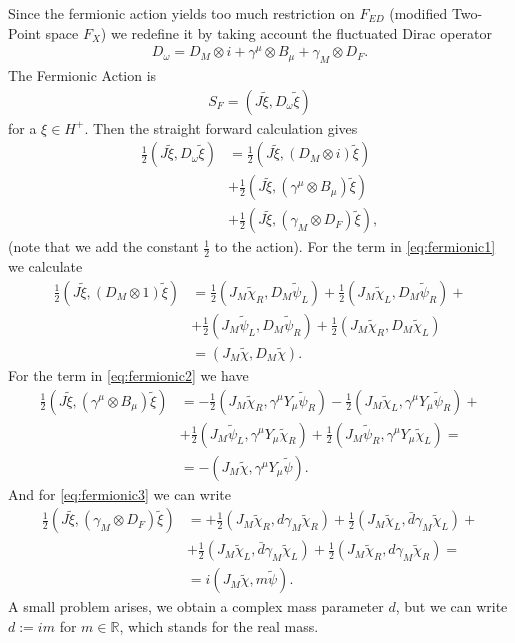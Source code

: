 Since the fermionic action yields too much restriction on $F_{ED}$ (modified
Two-Point space $F_X$) we redefine it by taking account the fluctuated Dirac
operator
\begin{align}
    D_\omega = D_M \otimes i + \gamma^\mu \otimes B_\mu + \gamma_M \otimes
    D_F.
\end{align}
The Fermionic Action is
\begin{align}
S_F = (J\tilde{\xi}, D_\omega\tilde{\xi})
\end{align}
for a $\xi \in H^+$. Then the straight forward calculation gives \begin{align}
    \frac{1}{2}(J\tilde{\xi}, D_\omega\tilde{\xi})
        &=\frac{1}{2}(J\tilde{\xi}, (D_M \otimes
        i)\tilde{\xi})\label{eq:fermionic1}\\
        &+\frac{1}{2}(J\tilde{\xi}, (\gamma^\mu \otimes B_\mu)
        \tilde{\xi})\label{eq:fermionic2}\\
        &+\frac{1}{2}(J\tilde{\xi}, (\gamma_M\otimes
        D_F)\tilde{\xi})\label{eq:fermionic3},
\end{align}
(note that we add the constant $\frac{1}{2}$ to the action).
For the term in \eqref{eq:fermionic1} we calculate
\begin{align}
    \frac{1}{2}(J\tilde{\xi}, (D_M\otimes 1)\tilde{\xi}) &=
    \frac{1}{2}(J_M\tilde{\chi}_R,D_M\tilde{\psi}_L)+\nonumber
    \frac{1}{2}(J_M\tilde{\chi}_L,D_M\tilde{\psi}_R)+
    \\&+\frac{1}{2}(J_M\tilde{\psi}_L,D_M\tilde{\psi}_R)+\nonumber
    \frac{1}{2}(J_M\tilde{\chi}_R,D_M\tilde{\chi}_L)\\
    &= (J_M\tilde{\chi},D_M\tilde{\chi}).
\end{align}
For the term in \eqref{eq:fermionic2} we have
\begin{align}
    \frac{1}{2}(J\tilde{\xi}, (\gamma^\mu \otimes B_\mu)\tilde{\xi})&=
    -\frac{1}{2}(J_M\tilde{\chi}_R, \gamma^\mu Y_\mu\tilde{\psi}_R)
    -\frac{1}{2}(J_M\tilde{\chi}_L, \gamma^\mu Y_\mu\tilde{\psi}_R)+\nonumber\\
    &+\frac{1}{2}(J_M\tilde{\psi}_L, \gamma^\mu Y_\mu\tilde{\chi}_R)+
    \frac{1}{2}(J_M\tilde{\psi}_R, \gamma^\mu Y_\mu\tilde{\chi}_L)=\nonumber\\
    &= -(J_M\tilde{\chi}, \gamma^\mu Y_\mu\tilde{\psi}).
\end{align}
And for \eqref{eq:fermionic3} we can write
\begin{align}
    \frac{1}{2}(J\tilde{\xi}, (\gamma_M\otimes D_F)\tilde{\xi})&=
    +\frac{1}{2}(J_M\tilde{\chi}_R, d\gamma_M\tilde{\chi}_R)
    +\frac{1}{2}(J_M\tilde{\chi}_L, \bar{d}\gamma_M\tilde{\chi}_L)+\nonumber\\
    &+\frac{1}{2}(J_M\tilde{\chi}_L, \bar{d}\gamma_M\tilde{\chi}_L)
    +\frac{1}{2}(J_M\tilde{\chi}_R, d\gamma_M\tilde{\chi}_R)=\nonumber\\
    &= i(J_M\tilde{\chi}, m\tilde{\psi}).
\end{align}
A small problem arises, we obtain a complex mass parameter $d$, but we can
write $d:=im$ for $m\in \mathbb{R}$, which stands for the real mass.

